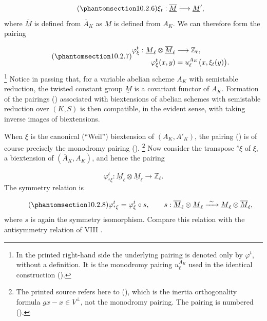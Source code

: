 \begin{equation}\tag{\SGARefTarget{sga7.sga7i.eix.n10-2-6}{10.2.6}}
\xi_t:\overline{\underline M}\longrightarrow\underline M',
\end{equation}
where $\overline{\underline M}$ is defined from $\overline A_K$ as
$\underline M$ is defined from $A_K$. We can therefore form the pairing

\begin{equation}\tag{\SGARefTarget{sga7.sga7i.eix.n10-2-7}{10.2.7}}
\begin{aligned}
\varphi^t_\xi:\underline M_\ell\otimes
 \overline{\underline M}_\ell&\longrightarrow\mathbb Z_\ell,\\
\varphi^t_\xi(x,y)&=u_\ell^{A_K}\bigl(x,\xi_t(y)\bigr).
\end{aligned}
\end{equation}
\footnote{In the printed right-hand side the underlying pairing is denoted
only by $\varphi^t$, without a definition. It is the monodromy pairing
$u_\ell^{A_K}$ used in the identical construction ().}
Notice in passing that, for a variable abelian scheme $A_K$ with semistable
reduction, the twisted constant group $\underline M$ is a covariant
functor of $A_K$. Formation of the pairings () associated with
biextensions of abelian schemes with semistable reduction over $(K,S)$ is
then compatible, in the evident sense, with taking inverse images of
biextensions.

When $\xi$ is the canonical (``Weil'') biextension of $(A_K,A'_K)$, the
pairing () is of course precisely the monodromy pairing ().
\footnote{The printed source refers here to (), which is the inertia
orthogonality formula $gx-x\in V^\perp$, not the monodromy pairing. The
pairing is numbered ().}
Now consider the transpose ${}^s\xi$ of $\xi$, a biextension of
$(\overline A_K,A_K)$, and hence the pairing

\begin{equation*}
\varphi^t_{{}^s\xi}:\overline{\underline M}_\ell\otimes
 \underline M_\ell\longrightarrow\mathbb Z_\ell.
\end{equation*}
The symmetry relation is

\begin{equation}\tag{\SGARefTarget{sga7.sga7i.eix.n10-2-8}{10.2.8}}
\varphi^t_{{}^s\xi}=\varphi^t_\xi\circ s,
\qquad
s:\overline{\underline M}_\ell\otimes\underline M_\ell
 \xrightarrow{\ \sim\ }
 \underline M_\ell\otimes\overline{\underline M}_\ell,
\end{equation}
where $s$ is again the symmetry isomorphism. Compare this relation with
the antisymmetry relation of VIII .

